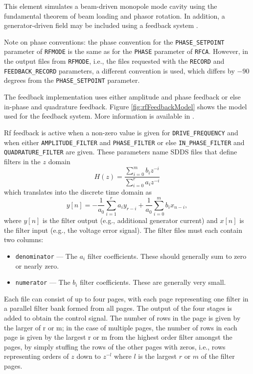 This element simulates a beam-driven monopole mode cavity using the fundamental theorem of beam loading and phasor rotation.
In addition, a generator-driven field may be included using a feedback system \cite{Berenc-IPAC15-MOPMA006}.

Note on phase conventions: the phase convention for the \verb|PHASE_SETPOINT|  parameter of \verb|RFMODE| is the
same as for the \verb|PHASE| parameter of \verb|RFCA|. However, in the output files from \verb|RFMODE|, i.e., the
files requested with the \verb|RECORD| and \verb|FEEDBACK_RECORD| parameters, a different convention is used, which 
differs by $-90$ degrees from the \verb|PHASE_SETPOINT|  parameter. 

The feedback implementation uses either amplitude and phase feedback or else in-phase and quadrature feedback.
Figure \ref{fig:rfFeedbackModel} shows the model used for the feedback system.
More information is available in \cite{Berenc-IPAC15-MOPMA006}.

Rf feedback is active when a non-zero value is given for \verb|DRIVE_FREQUENCY| and when either
\verb|AMPLITUDE_FILTER| and \verb|PHASE_FILTER| or else
\verb|IN_PHASE_FILTER| and \verb|QUADRATURE_FILTER| are given.
These parameters name SDDS files that define filters in the $z$ domain 
\begin{equation}
H(z) = \frac{\sum\limits_{i=0}^m b_i z^{-i}}{\sum\limits_{i=0}^r a_i z^{-i}}
\end{equation}
which translates into the discrete time domain as
\begin{equation}
y[n ] = -\frac{1}{a_0}\sum\limits_{i=1}^r a_i y_{r-i} + \frac{1}{a_0}\sum\limits_{i=0}^m b_i x_{n-i},
\end{equation}
where $y[n]$ is the filter output (e.g., additional generator current) and $x[n]$ is the filter input (e.g., 
the voltage error signal). 
The filter files must each contain two columns:
\begin{itemize}
\item \verb|denominator| --- The $a_i$ filter coefficients. These should generally sum to zero or nearly zero.
\item \verb|numerator| --- The $b_i$ filter coefficients. These are generally very small.
\end{itemize}
Each file can consist of up to four pages, with each page representing one filter in a parallel filter bank 
formed from all pages. The output of the four stages is added to obtain the control signal.
The number of rows in the page is given by the larger of r or m; in the case of multiple pages,
the number of rows in each page is given by the largest r or m from the highest order filter amongst the pages, by
simply stuffing the rows of the other pages with zeros, i.e., rows representing orders of $z$ down to $z^{-l}$ where $l$ is
the largest $r$ or $m$ of the filter pages.

